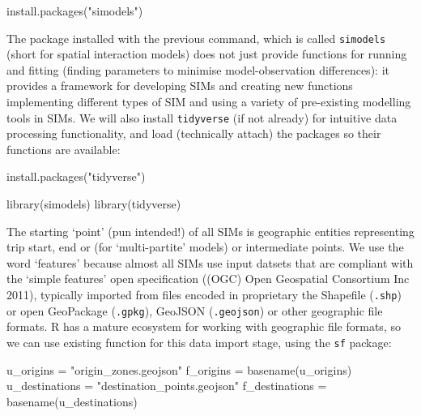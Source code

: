 \documentclass[11pt,letterpaper]{article}
\newenvironment{Shaded}{\begin{snugshade}}{\end{snugshade}}
\newcommand{\FunctionTok}[1]{\textcolor[rgb]{0.00,0.00,0.00}{#1}}
\newcommand{\NormalTok}[1]{#1}
\newcommand{\OtherTok}[1]{\textcolor[rgb]{0.56,0.35,0.01}{#1}}
\newcommand{\StringTok}[1]{\textcolor[rgb]{0.31,0.60,0.02}{#1}}
\begin{document}
\begin{Shaded}
\begin{Highlighting}[]
\FunctionTok{install.packages}\NormalTok{(}\StringTok{"simodels"}\NormalTok{)}
\end{Highlighting}
\end{Shaded}

The package installed with the previous command, which is called \texttt{simodels} (short for spatial interaction models) does not just provide functions for running and fitting (finding parameters to minimise model-observation differences): it provides a framework for developing SIMs and creating new functions implementing different types of SIM and using a variety of pre-existing modelling tools in SIMs.
We will also install \texttt{tidyverse} (if not already) for intuitive data processing functionality, and load (technically attach) the packages so their functions are available:

\begin{Shaded}
\begin{Highlighting}[]
\FunctionTok{install.packages}\NormalTok{(}\StringTok{"tidyverse"}\NormalTok{)}
\end{Highlighting}
\end{Shaded}

\begin{Shaded}
\begin{Highlighting}[]
\FunctionTok{library}\NormalTok{(simodels)}
\FunctionTok{library}\NormalTok{(tidyverse)}
\end{Highlighting}
\end{Shaded}

The starting `point' (pun intended!) of all SIMs is geographic entities representing trip start, end or (for `multi-partite' models) or intermediate points.
We use the word `features' because almost all SIMs use input datsets that are compliant with the `simple features' open specification ((OGC) Open Geospatial Consortium Inc 2011), typically imported from files encoded in proprietary the Shapefile (\texttt{.shp}) or open GeoPackage (\texttt{.gpkg}), GeoJSON (\texttt{.geojson}) or other geographic file formats.
R has a mature ecosystem for working with geographic file formats, so we can use existing function for this data import stage, using the \texttt{sf} package:

\begin{Shaded}
\begin{Highlighting}[]
\NormalTok{u\_origins }\OtherTok{=} \StringTok{"origin\_zones.geojson"}
\NormalTok{f\_origins }\OtherTok{=} \FunctionTok{basename}\NormalTok{(u\_origins)}
\NormalTok{u\_destinations }\OtherTok{=} \StringTok{"destination\_points.geojson"}
\NormalTok{f\_destinations }\OtherTok{=} \FunctionTok{basename}\NormalTok{(u\_destinations)}
\end{Highlighting}
\end{Shaded}
\end{document}
